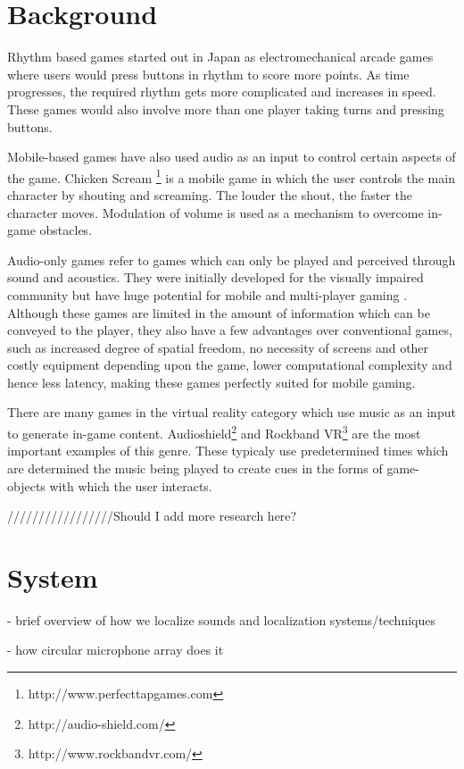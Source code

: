 \documentclass[convention]{aesconf}
\begin{document}
\section{Background}
Rhythm based games started out in Japan as electromechanical arcade games where users would press buttons in rhythm to score more points. As time progresses, the required rhythm gets more complicated and increases in speed. These games would also involve more than one player taking turns and pressing buttons.

Mobile-based games have also used audio as an input to control certain aspects of the game. Chicken Scream \footnote{http://www.perfecttapgames.com} is a mobile game in which the user controls the main character by shouting and screaming. The louder the shout, the faster the character moves. Modulation of volume is used as a mechanism to overcome in-game obstacles.

Audio-only games refer to games which can only be played and perceived through sound and acoustics. They were initially developed for the visually impaired community but have huge potential for mobile and multi-player gaming \cite{rober2005playing}. Although these games are limited in the amount of information which can be conveyed to the player, they also have a few advantages over conventional games, such as increased degree of spatial freedom, no necessity of screens and other costly equipment depending upon the game, lower computational complexity and hence less latency, making these games perfectly suited for mobile gaming.

There are many games in the virtual reality category which use music as an input to generate in-game content. Audioshield\footnote{http://audio-shield.com/} and Rockband VR\footnote{http://www.rockbandvr.com/} are the most important examples of this genre. These typicaly use predetermined times which are determined the  music being played to create cues in the forms of game-objects with which the user interacts.

/////////////////Should I add more research here? \cite{Igarashi:2001:VSU:502348.502372}

\section{System}  

- brief overview of how we localize sounds and localization systems/techniques

- how circular microphone array does it
\end{document}
